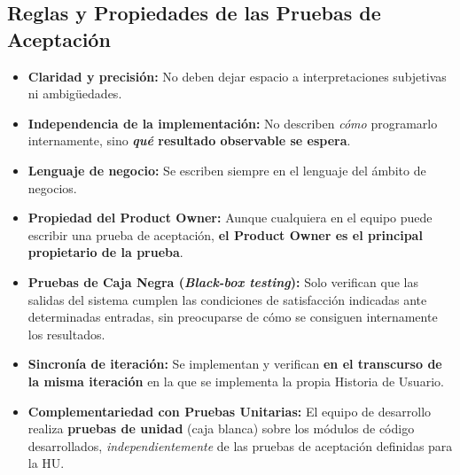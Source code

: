 \subsection{Reglas y Propiedades de las Pruebas de Aceptación}
\begin{itemize}[itemsep=3pt]
    \item \textbf{Claridad y precisión:} No deben dejar espacio a interpretaciones subjetivas ni ambigüedades.
    \item \textbf{Independencia de la implementación:} No describen \textit{cómo} programarlo internamente, sino \textbf{\textit{qué} resultado observable se espera}.
    \item \textbf{Lenguaje de negocio:} Se escriben siempre en el lenguaje del ámbito de negocios.
    \item \textbf{Propiedad del Product Owner:} Aunque cualquiera en el equipo puede escribir una prueba de aceptación, \textbf{el Product Owner es el principal propietario de la prueba}.
    \item \textbf{Pruebas de Caja Negra (\textit{Black-box testing}):} Solo verifican que las salidas del sistema cumplen las condiciones de satisfacción indicadas ante determinadas entradas, sin preocuparse de cómo se consiguen internamente los resultados.
    \item \textbf{Sincronía de iteración:} Se implementan y verifican \textbf{en el transcurso de la misma iteración} en la que se implementa la propia Historia de Usuario.
    \item \textbf{Complementariedad con Pruebas Unitarias:} El equipo de desarrollo realiza \textbf{pruebas de unidad} (caja blanca) sobre los módulos de código desarrollados, \textit{independientemente} de las pruebas de aceptación definidas para la HU.
\end{itemize}

